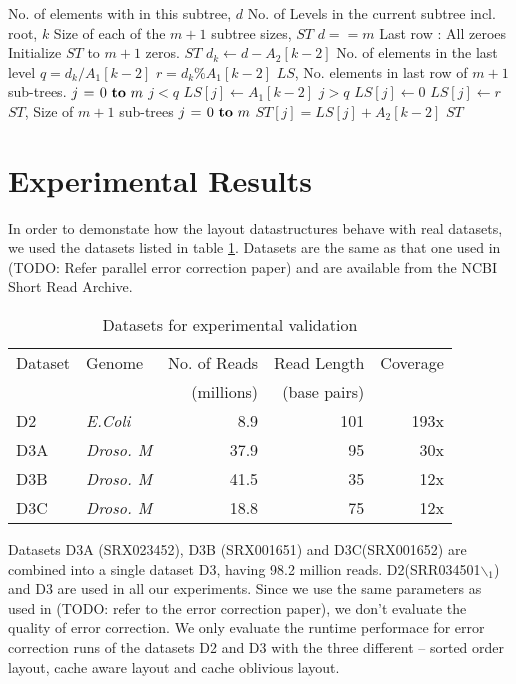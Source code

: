 \documentclass[integrals, nointegrals, article, 12pt, a4paper]{article}
\begin{document}
\begin{codebox}
\zi {} No. of elements with in this subtree, $d$
\zi {} No. of Levels in the current subtree incl. root, $k$
\zi {} Size of each of the $m+1$ subtree sizes, $ST$
\li \If $d == m$ \Comment Last row : All zeroes
\li \Do Initialize $ST$ to $m+1$ zeros.
\li     \Return $ST$ \End
\li $d_k \gets d - A_2[k - 2]$ \Comment No. of elements in the last level
\li $q = d_k / A_1[k - 2]$
\li $r = d_k \% A_1[k - 2]$
\zi \Comment $LS$, No. elements in last row of $m+1$ sub-trees.
\li \For $j \gets 0 \To m$
\li \Do \If $j < q$
\li        \Then $LS[j] \gets A_1[k - 2]$
\li      \ElseIf $j > q$
\li        \Then $LS[j] \gets 0$
\li      \Else
\li         $LS[j] \gets r$ \End
    \End
\zi \Comment $ST$, Size of $m+1$ sub-trees
\li \For $j \gets 0 \To m$
\li \Do $ST[j] = LS[j] + A_2[k-2]$ \End
\li \Return $ST$
\end{codebox}


\section{Experimental Results}
\label{sec-2}

In order to demonstate how the layout datastructures behave with real
datasets, we used the datasets listed in table
\ref{tab:datasets}. Datasets are the same as that one used in (TODO: Refer
parallel error correction paper) and are available from the NCBI Short
Read Archive.

\begin{table}[htb]
\caption{\label{tab:datasets}Datasets for experimental validation}
\centering
\begin{tabular}{llrrr}
\hline
Dataset & Genome & No. of Reads & Read Length & Coverage\\
 &  & (millions) & (base pairs) & \\
\hline
D2 & \emph{E.Coli} & 8.9 & 101 & 193x\\
D3A & \emph{Droso. M} & 37.9 & 95 & 30x\\
D3B & \emph{Droso. M} & 41.5 & 35 & 12x\\
D3C & \emph{Droso. M} & 18.8 & 75 & 12x\\
\hline
\end{tabular}
\end{table}


Datasets D3A (SRX023452), D3B (SRX001651) and D3C(SRX001652) are
combined into a single dataset D3, having 98.2 million
reads. D2(SRR034501$\backslash$$_{\text{1}}$) and D3 are used in all our experiments. Since we
use the same parameters as used in (TODO: refer to the error correction
paper), we don't evaluate the quality of error correction. We only
evaluate the runtime performace for error correction runs of the
datasets D2 and D3 with the three different -- sorted order layout,
cache aware layout and cache oblivious layout.
\end{document}
